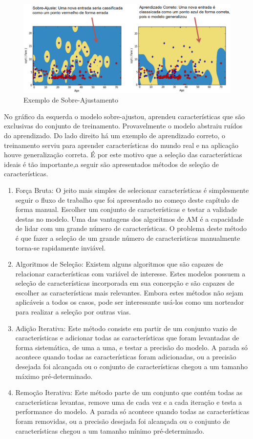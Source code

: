 \begin{figure}[!h]
\centering
\includegraphics[keepaspectratio=true,scale=0.40]
{figuras/overfitting.eps}
\caption{Exemplo de Sobre-Ajustamento}
\label{over}
\end{figure}

No gráfico da esquerda o modelo sobre-ajustou, aprendeu características que são exclusivas do conjunto de treinamento. Provavelmente o modelo abstraiu ruídos do aprendizado. Do lado direito há um exemplo de aprendizado correto, o treinamento serviu para aprender características do mundo real e na aplicação houve generalização correta. É por este motivo que a seleção das características ideais é tão importante,a seguir são apresentados  métodos de seleção de características.

\begin{enumerate}
\item Força Bruta: O jeito mais simples de selecionar características é simplesmente seguir o fluxo de trabalho que foi apresentado no começo deste capítulo de forma manual. Escolher um conjunto de características e testar a validade destas no modelo. Uma das vantagens dos algoritmos de AM é a capacidade de lidar com um grande número de características. O problema deste método é que fazer a seleção de um grande número de características manualmente torna-se rapidamente inviável. 
\item Algoritmos de Seleção: Existem alguns algoritmos que são capazes de relacionar características com variável de interesse. Estes modelos possuem a seleção de características incorporada em sua concepção e são capazes de escolher as características mais relevantes. Embora estes métodos não sejam aplicáveis a todos os casos, pode ser interessante usá-los como um norteador para realizar a seleção por outras vias. 
\item Adição Iterativa: Este método consiste em partir de um conjunto vazio de características e adicionar todas as características que foram levantadas de forma sistemática, de uma a uma, e testar a precisão do modelo. A parada só acontece quando todas as características foram adicionadas, ou a precisão desejada foi alcançada ou o conjunto de características chegou a um tamanho máximo pré-determinado.
\item Remoção Iterativa: Este método parte de um conjunto que contém todas as características levantas, remove uma de cada vez e a cada iteração e testa a performance do modelo. A parada só acontece quando todas as características foram removidas, ou a precisão desejada foi alcançada ou o conjunto de características chegou a um tamanho mínimo pré-determinado.
\end{enumerate}

